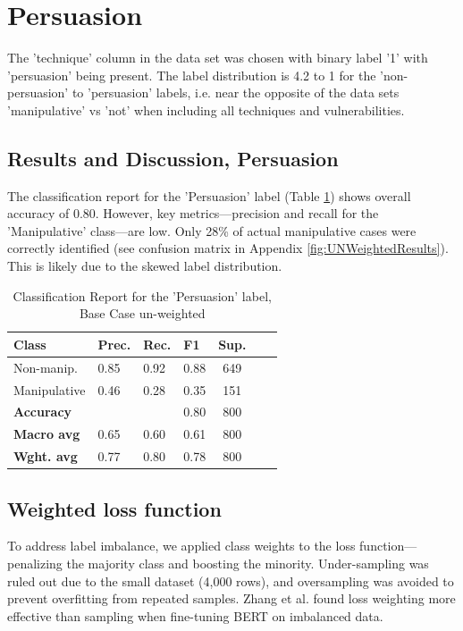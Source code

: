 \documentclass[
	letterpaper, %
	12pt, %
	unnumberedsections, %
	twoside, %
]{LTJournalArticle}
\begin{document}
\section{Persuasion}
The 'technique' column in the data set was chosen with binary label '1' with 'persuasion' being present. The label distribution is 4.2 to 1 for the 'non-persuasion' to 'persuasion' labels, i.e. near the opposite of the data sets 'manipulative' vs 'not' when including all techniques and vulnerabilities.

\subsection{Results and Discussion, Persuasion}

The classification report for the 'Persuasion' label (Table \ref{tab:BaseCasePersuasionReport}) shows overall accuracy of 0.80. However, key metrics—precision and recall for the 'Manipulative' class—are low. Only 28\% of actual manipulative cases were correctly identified (see confusion matrix in Appendix \ref{fig:UNWeightedResults}). This is likely due to the skewed label distribution.


\begin{table}[h!]
	\small
	\centering
	\begin{tabular}{|p{2.2cm}|p{1cm}|p{1cm}|p{1cm}|c|c|c|}
		\hline
		\textbf{Class}     & \textbf{Prec.} & \textbf{Rec.} & \textbf{F1} & \textbf{Sup.} \\
		\hline
		Non-manip.         & 0.85           & 0.92          & 0.88        & 649           \\
		\hline
		Manipulative       & 0.46           & 0.28          & 0.35        & 151           \\
		\hline
		\hline
		\textbf{Accuracy}  &                &               & 0.80        & 800           \\
		\hline
		\textbf{Macro avg} & 0.65           & 0.60          & 0.61        & 800           \\
		\hline
		\textbf{Wght. avg} & 0.77           & 0.80          & 0.78        & 800           \\
		\hline
	\end{tabular}
	\caption{Classification Report for the 'Persuasion' label, Base Case un-weighted}
	\label{tab:BaseCasePersuasionReport}
\end{table}

\subsection{Weighted loss function}
To address label imbalance, we applied class weights to the loss function—penalizing the majority class and boosting the minority. Under-sampling was ruled out due to the small dataset (4,000 rows), and oversampling was avoided to prevent overfitting from repeated samples. Zhang et al. \cite{zhang2020revisiting} found loss weighting more effective than sampling when fine-tuning BERT on imbalanced data.
\end{document}
